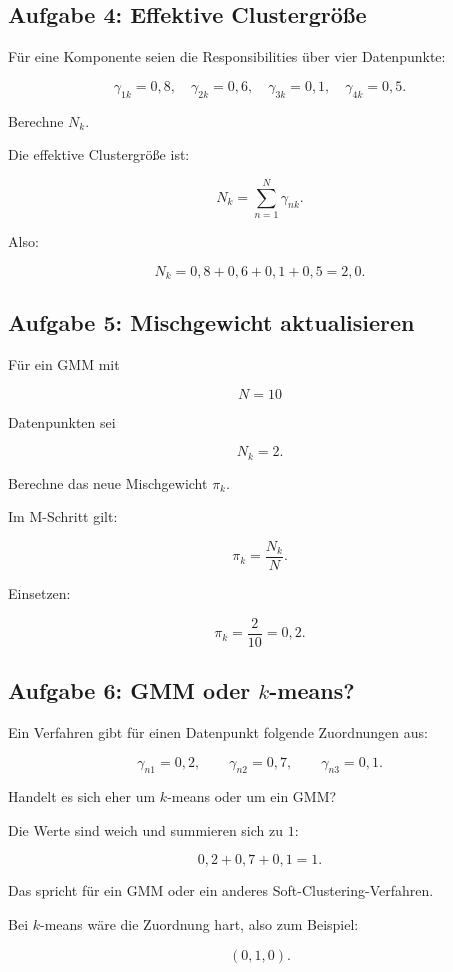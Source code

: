 \subsection{Aufgabe 4: Effektive Clustergröße}

Für eine Komponente seien die Responsibilities über vier Datenpunkte:

\[
    \gamma_{1k}=0{,}8,
    \quad
    \gamma_{2k}=0{,}6,
    \quad
    \gamma_{3k}=0{,}1,
    \quad
    \gamma_{4k}=0{,}5.
\]

Berechne \(N_k\).

\begin{examplebox}
Die effektive Clustergröße ist:

\[
    N_k
    =
    \sum_{n=1}^{N}
    \gamma_{nk}.
\]

Also:

\[
    N_k
    =
    0{,}8+0{,}6+0{,}1+0{,}5
    =
    2{,}0.
\]
\end{examplebox}

\subsection{Aufgabe 5: Mischgewicht aktualisieren}

Für ein GMM mit

\[
    N=10
\]

Datenpunkten sei

\[
    N_k=2.
\]

Berechne das neue Mischgewicht \(\pi_k\).

\begin{examplebox}
Im M-Schritt gilt:

\[
    \pi_k
    =
    \frac{N_k}{N}.
\]

Einsetzen:

\[
    \pi_k
    =
    \frac{2}{10}
    =
    0{,}2.
\]
\end{examplebox}

\subsection{Aufgabe 6: GMM oder \(k\)-means?}

Ein Verfahren gibt für einen Datenpunkt folgende Zuordnungen aus:

\[
    \gamma_{n1}=0{,}2,
    \qquad
    \gamma_{n2}=0{,}7,
    \qquad
    \gamma_{n3}=0{,}1.
\]

Handelt es sich eher um \(k\)-means oder um ein GMM?

\begin{examplebox}
Die Werte sind weich und summieren sich zu \(1\):

\[
    0{,}2+0{,}7+0{,}1=1.
\]

Das spricht für ein GMM oder ein anderes Soft-Clustering-Verfahren.

Bei \(k\)-means wäre die Zuordnung hart, also zum Beispiel:

\[
    (0,1,0).
\]
\end{examplebox}

